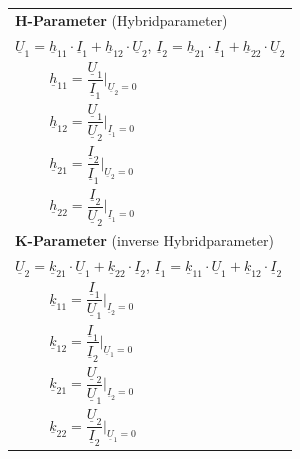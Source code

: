 \documentclass[a4paper,12pt]{scrartcl}
\begin{document}
\newpage

\begin{tabular}{@{} l l @{}}

  
\multicolumn{2}{l}{\textbf{H-Parameter} (Hybridparameter)} \\
\multicolumn{2}{l}{\enspace $\underline{U}_1 = \underline{h}_{11}\cdot\underline{I}_1 + \underline{h}_{12}\cdot\underline{U}_2$, \quad $\underline{I}_2 = \underline{h}_{21}\cdot\underline{I}_1 + \underline{h}_{22}\cdot\underline{U}_2$} \\
\hspace*{20mm} & $\underline{h}_{11} = \dfrac{\underline{U}_1}{\underline{I}_1}\bigg|_{\underline{U}_2=0}$ \\
\hspace*{20mm} & $\underline{h}_{12} = \dfrac{\underline{U}_1}{\underline{U}_2}\bigg|_{\underline{I}_1=0}$ \\
\hspace*{20mm} & $\underline{h}_{21} = \dfrac{\underline{I}_2}{\underline{I}_1}\bigg|_{\underline{U}_2=0}$ \\
\hspace*{20mm} & $\underline{h}_{22} = \dfrac{\underline{I}_2}{\underline{U}_2}\bigg|_{\underline{I}_1=0}$ \\[3mm]

\multicolumn{2}{l}{\textbf{K-Parameter} (inverse Hybridparameter)} \\
\multicolumn{2}{l}{\enspace $\underline{U}_2 = \underline{k}_{21}\cdot\underline{U}_1 + \underline{k}_{22}\cdot\underline{I}_2$, \quad $\underline{I}_1 = \underline{k}_{11}\cdot\underline{U}_1 + \underline{k}_{12}\cdot\underline{I}_2$} \\
\hspace*{20mm} & $\underline{k}_{11} = \dfrac{\underline{I}_1}{\underline{U}_1}\bigg|_{\underline{I}_2=0}$ \\
\hspace*{20mm} & $\underline{k}_{12} = \dfrac{\underline{I}_1}{\underline{I}_2}\bigg|_{\underline{U}_1=0}$ \\
\hspace*{20mm} & $\underline{k}_{21} = \dfrac{\underline{U}_2}{\underline{U}_1}\bigg|_{\underline{I}_2=0}$ \\
\hspace*{20mm} & $\underline{k}_{22} = \dfrac{\underline{U}_2}{\underline{I}_2}\bigg|_{\underline{U}_1=0}$ \\[3mm]


\end{tabular}
\end{document}

